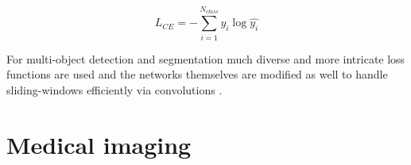 \documentclass[a4paper,12pt]{article}
\begin{document}
\begin{equation}
    L_{CE} = - \sum_{i = 1}^{N_{class}} y_{i}\log\hat{y_{i}}
\end{equation}

\vspace{4mm}

\par For multi-object detection and segmentation much diverse and more intricate loss functions are used and the networks themselves \cite{ren2015faster} are modified as well to handle sliding-windows efficiently via convolutions \cite{redmon2016you}.

\section{ Medical imaging}

\newpage



\end{document}
